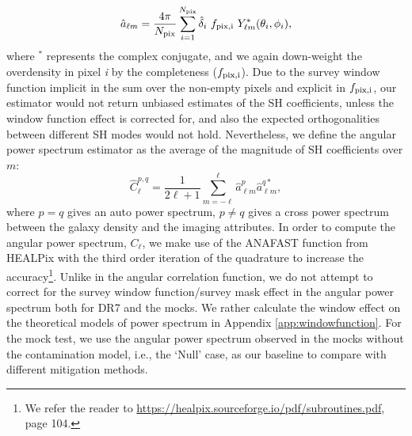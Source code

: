 \begin{itemize}
    \begin{equation}
        \hat{a}_{\ell m} = \frac{4\pi}{N_{{\rm pix}}} \sum_{i=1}^{N_{{\rm pix}}}  \hat{\delta}_{i}~f_{\rm pix, i}~ Y^{*}_{\ell m}(\theta_{i}, \phi_{i}),
    \end{equation}
    where $^{*}$ represents the complex conjugate, and we again down-weight the overdensity in pixel \textit{i} by the completeness ($f_{\rm pix, i}$). Due to the survey window function implicit in the sum over the non-empty pixels and explicit in $f_{\rm pix, i}$, our estimator would not return unbiased estimates of the SH coefficients, unless the window function effect is corrected for, and also the expected orthogonalities between different SH modes would not hold. Nevertheless, we define the angular power spectrum estimator as the average of the magnitude of SH coefficients over $m$:
    \begin{equation}\label{eq:pusedocell}
        \hat{C}^{p,q}_{\ell} = \frac{1}{2\ell +1} \sum_{m=-\ell}^{\ell} \hat{a}^{p}_{\ell m} \hat{a}^{q*}_{\ell m},
    \end{equation}
    where $p=q$ gives an auto power spectrum, $p\neq q$ gives a cross power spectrum between the galaxy density and the imaging attributes. In order to compute the angular power spectrum, $C_{\ell}$, we make use of the ANAFAST function from HEALPix \citep{gorski2005healpix} with the third order iteration of the quadrature to increase the accuracy\footnote{We refer the reader to \url{https://healpix.sourceforge.io/pdf/subroutines.pdf}, page 104.}. 
    Unlike in the angular correlation function, we do not attempt to correct for the survey window function/survey mask effect in the angular power spectrum both for DR7 and the mocks. We rather calculate the window effect on the theoretical models of power spectrum in Appendix \ref{app:windowfunction}. For the mock test, we use the angular power spectrum observed in the mocks without the contamination model, i.e., the `Null' case, as our baseline to compare with different mitigation methods.\\ 
\end{itemize}
%
%
